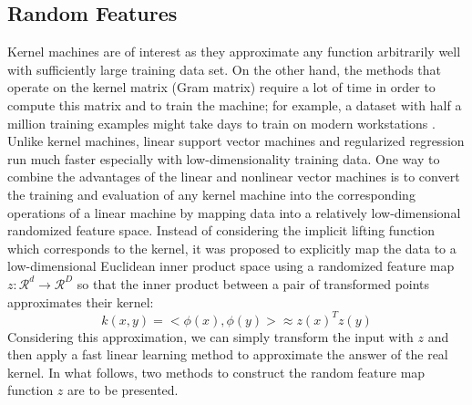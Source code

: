 \subsection{Random Features}
Kernel machines are of interest as they approximate any function arbitrarily well with sufficiently large training data set. On the other hand, the methods that operate on the kernel matrix (Gram matrix) require a lot of time in order to compute this matrix and to train the machine; for example, a dataset with half a million training examples might take days to train on modern workstations \citep{rahimi2008random}.
Unlike kernel machines, linear support vector machines and regularized regression run much faster especially with low-dimensionality training data. 
One way to combine the advantages of the linear and nonlinear vector machines is to convert the training and evaluation of any kernel machine into the corresponding operations of a linear machine by mapping data into a relatively low-dimensional randomized feature space.
Instead of considering the implicit lifting function which corresponds to the kernel, it was proposed to explicitly map the data to a low-dimensional Euclidean inner product space using a randomized feature map $z:\mathcal{R}^d \xrightarrow{}\mathcal{R}^D$ so that the inner product between a pair of transformed points approximates their kernel:
\begin{equation}
\label{eq:approx_RF}
k(x,y)=<\phi(x),\phi(y)> \approx z(x)^Tz(y)
\end{equation}
Considering this approximation, we can simply transform the input with $z$ and then apply a fast linear learning method to approximate the answer of the real kernel. \newline
In what follows, two methods to construct the random feature map function $z$ are to be presented.

